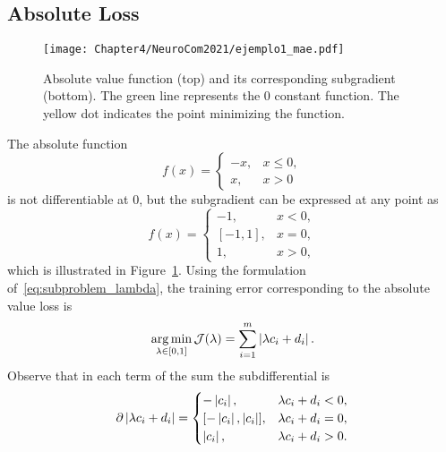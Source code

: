 \subsection{Absolute Loss}
\begin{figure}[t!]
    \centering
    \texttt{[image: Chapter4/NeuroCom2021/ejemplo1\_mae.pdf]}
    \caption{Absolute value function (top) and its corresponding subgradient (bottom). The green line represents the $0$ constant function. The yellow dot indicates the point minimizing the function.}
    \label{fig:abs_loss}
\end{figure}
The absolute function 
\begin{equation}
    \nonumber
    f(x) = 
    \begin{cases}
    -x ,& x \leq 0, \\
    x ,& x > 0    
    \end{cases}
\end{equation}
is not differentiable at $0$, but the subgradient can be expressed at any point as
\begin{equation}
    \nonumber
    f(x) = 
    \begin{cases}
    -1 ,& x < 0, \\
    [-1, 1] ,& x = 0 , \\
    1 ,& x > 0 ,
    \end{cases}
\end{equation}
which is illustrated in Figure~\ref{fig:abs_loss}.
Using the formulation of~\eqref{eq:subproblem_lambda}, the training error corresponding to the absolute value loss is
\begin{equation}
    \label{eq:opt_abs}
    \argmin_{\lambda \in [0, 1]} \mathcal{J}(\lambda) = \sum_{i=1}^{\npertask} \abs{\lambda c_i + d_i}.
\end{equation}
Observe that in each term of the sum the subdifferential is 
\begin{equation}
    \label{eq:subdiff_abs}
    \begin{aligned}
        \partial \abs{\lambda c_i + d_i} = 
    \begin{cases}
        -\abs{c_i} ,& \lambda c_i + d_i  < 0, \\
        [-\abs{c_i}, \abs{c_i}] ,& \lambda c_i + d_i  = 0, \\
        \abs{c_i} ,& \lambda c_i + d_i  > 0 .\\
    \end{cases}
    \end{aligned}
\end{equation}
